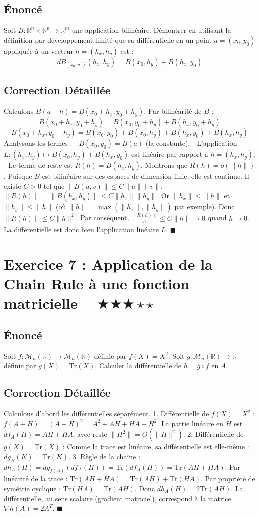 \documentclass[11pt,a4paper]{article}
\begin{document}
\subsection*{Énoncé}
Soit $B : \mathbb{R}^n \times \mathbb{R}^p \to \mathbb{R}^m$ une application bilinéaire.
Démontrer en utilisant la définition par développement limité que sa différentielle en un point $a = (x_0, y_0)$ appliquée à un vecteur $h = (h_x, h_y)$ est :
$$ dB_{(x_0, y_0)}(h_x, h_y) = B(x_0, h_y) + B(h_x, y_0) $$
\subsection*{Correction Détaillée}
Calculons $B(a+h) = B(x_0+h_x, y_0+h_y)$.
Par bilinéarité de $B$ :
$$ B(x_0+h_x, y_0+h_y) = B(x_0, y_0+h_y) + B(h_x, y_0+h_y) $$
$$ B(x_0+h_x, y_0+h_y) = B(x_0, y_0) + B(x_0, h_y) + B(h_x, y_0) + B(h_x, h_y) $$
Analysons les termes :
- $B(x_0, y_0) = B(a)$ (la constante).
- L'application $L : (h_x, h_y) \mapsto B(x_0, h_y) + B(h_x, y_0)$ est linéaire par rapport à $h=(h_x, h_y)$.
- Le terme de reste est $R(h) = B(h_x, h_y)$.
Montrons que $R(h) = o(\|h\|)$.
Puisque $B$ est bilinéaire sur des espaces de dimension finie, elle est continue. Il existe $C > 0$ tel que $\|B(u, v)\| \le C\|u\|\|v\|$.
$\|R(h)\| = \|B(h_x, h_y)\| \le C \|h_x\| \|h_y\|$.
Or $\|h_x\| \le \|h\|$ et $\|h_y\| \le \|h\|$ (où $\|h\| = \max(\|h_x\|, \|h_y\|)$ par exemple).
Donc $\|R(h)\| \le C \|h\|^2$.
Par conséquent, $\frac{\|R(h)\|}{\|h\|} \le C\|h\| \to 0$ quand $h \to 0$.
La différentielle est donc bien l'application linéaire $L$.
$\blacksquare$

\newpage
\section*{Exercice 7 : Application de la Chain Rule à une fonction matricielle $\quad \bigstar\bigstar\bigstar\star\star$}
\subsection*{Énoncé}
Soit $f : \mathcal{M}_n(\mathbb{R}) \to \mathcal{M}_n(\mathbb{R})$ définie par $f(X) = X^2$.
Soit $g : \mathcal{M}_n(\mathbb{R}) \to \mathbb{R}$ définie par $g(X) = \mathrm{Tr}(X)$.
Calculer la différentielle de $h = g \circ f$ en $A$.
\subsection*{Correction Détaillée}
Calculons d'abord les différentielles séparément.
1. Différentielle de $f(X) = X^2$ :
   $f(A+H) = (A+H)^2 = A^2 + AH + HA + H^2$.
   La partie linéaire en $H$ est $df_A(H) = AH + HA$, avec reste $\|H^2\| = O(\|H\|^2)$.
2. Différentielle de $g(X) = \mathrm{Tr}(X)$ :
   Comme la trace est linéaire, sa différentielle est elle-même : $dg_B(K) = \mathrm{Tr}(K)$.
3. Règle de la chaîne :
   $dh_A(H) = dg_{f(A)}(df_A(H)) = \mathrm{Tr}(df_A(H)) = \mathrm{Tr}(AH + HA)$.
   Par linéarité de la trace : $\mathrm{Tr}(AH + HA) = \mathrm{Tr}(AH) + \mathrm{Tr}(HA)$.
   Par propriété de symétrie cyclique : $\mathrm{Tr}(HA) = \mathrm{Tr}(AH)$.
   Donc $dh_A(H) = 2\mathrm{Tr}(AH)$.
La différentielle, au sens scalaire (gradient matriciel), correspond à la matrice $\nabla h(A) = 2A^T$.
$\blacksquare$
\end{document}
